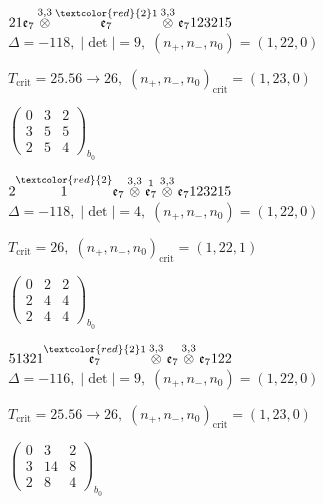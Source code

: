 \documentclass[10pt]{article}
\begin{document}
\smallskip

$21\mathfrak{e}_7\overset{3,3}{\otimes}\overset{\textcolor{red}{2}1}{\mathfrak{e}_7}\overset{3,3}{\otimes}\mathfrak{e}_7123215$ \quad $\Delta=-118,\; |\det|=9,\; (n_+,n_-,n_0)=(1,22,0)$

\hspace{1em}$T_{\text{crit}}=25.56 \to 26,\; (n_+,n_-,n_0)_{\text{crit}}=(1,23,0)$

\hspace{2em}$\left(\begin{smallmatrix}0 & 3 & 2 \\ 3 & 5 & 5 \\ 2 & 5 & 4\end{smallmatrix}\right)_{\!b_0}$

$2\overset{\textcolor{red}{2}}{1}\mathfrak{e}_7\overset{3,3}{\otimes}\overset{1}{\mathfrak{e}_7}\overset{3,3}{\otimes}\mathfrak{e}_7123215$ \quad $\Delta=-118,\; |\det|=4,\; (n_+,n_-,n_0)=(1,22,0)$

\hspace{1em}$T_{\text{crit}}=26,\; (n_+,n_-,n_0)_{\text{crit}}=(1,22,1)$

\hspace{2em}$\left(\begin{smallmatrix}0 & 2 & 2 \\ 2 & 4 & 4 \\ 2 & 4 & 4\end{smallmatrix}\right)_{\!b_0}$

\smallskip

$51321\overset{\textcolor{red}{2}1}{\mathfrak{e}_7}\overset{3,3}{\otimes}\mathfrak{e}_7\overset{3,3}{\otimes}\mathfrak{e}_7122$ \quad $\Delta=-116,\; |\det|=9,\; (n_+,n_-,n_0)=(1,22,0)$

\hspace{1em}$T_{\text{crit}}=25.56 \to 26,\; (n_+,n_-,n_0)_{\text{crit}}=(1,23,0)$

\hspace{2em}$\left(\begin{smallmatrix}0 & 3 & 2 \\ 3 & 14 & 8 \\ 2 & 8 & 4\end{smallmatrix}\right)_{\!b_0}$
\end{document}
